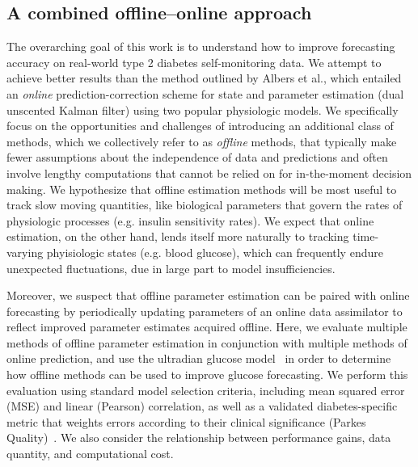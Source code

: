 \documentclass[10pt,letterpaper]{article}
\begin{document}

\subsection{A combined offline--online approach}
The overarching goal of this work is to understand how to improve forecasting accuracy on real-world type 2 diabetes self-monitoring data. We attempt to achieve better results than the method outlined by Albers et al., which entailed an \emph{online} prediction-correction scheme for state and parameter estimation (dual unscented Kalman filter) using two popular physiologic models.
We specifically focus on the opportunities and challenges of introducing an additional class of methods, which we collectively refer to as \emph{offline} methods, that typically make fewer assumptions about the independence of data and predictions and often involve lengthy computations that cannot be relied on for in-the-moment decision making. We hypothesize that offline estimation methods will be most useful to track slow moving quantities, like biological parameters that govern the rates of physiologic processes (e.g. insulin sensitivity rates). We expect that online estimation, on the other hand, lends itself more naturally to tracking time-varying phyisiologic states (e.g. blood glucose), which can frequently endure unexpected fluctuations, due in large part to model insufficiencies. 

Moreover, we suspect that offline parameter estimation can be paired with online forecasting by periodically updating parameters of an online data assimilator to reflect improved parameter estimates acquired offline. Here, we evaluate multiple methods of offline parameter estimation in conjunction with multiple methods of online prediction, and use the ultradian glucose model~\cite{sturisUltradian} in order to determine how offline methods can be used to improve glucose forecasting. We perform this evaluation using standard model selection criteria, including mean squared error (MSE) and linear (Pearson) correlation, as well as a validated diabetes-specific metric that weights errors according to their clinical significance (Parkes Quality)~\cite{parkes_new_2000,pfutzner_technical_2013}. We also consider the relationship between performance gains, data quantity, and computational cost.
\end{document}

